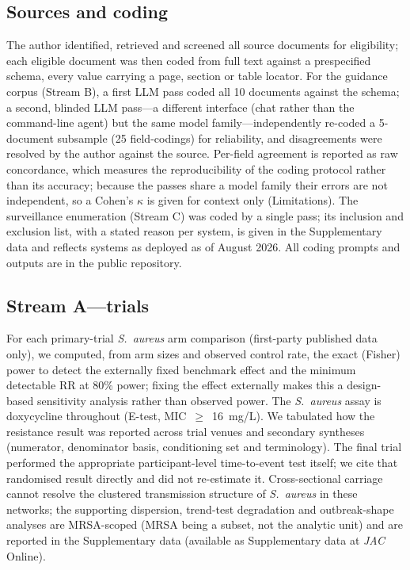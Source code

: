 \documentclass[12pt,a4paper]{article}
\newcommand{\sa}{\emph{S.~aureus}}
\begin{document}
\subsection*{Sources and coding}
The author identified, retrieved and screened all source documents for
eligibility; each eligible document was then coded from full text against a
prespecified schema, every value carrying a page, section or table locator. For
the guidance corpus (Stream B), a first LLM pass coded all 10 documents against
the schema; a second, blinded LLM pass---a different interface (chat rather than
the command-line agent) but the same model family---independently re-coded a
5-document subsample (25 field-codings) for reliability, and disagreements were
resolved by the author against the source. Per-field agreement is reported as raw
concordance, which measures the reproducibility of the coding protocol rather than
its accuracy; because the passes share a model family their errors are not
independent, so a Cohen's $\kappa$ is given for context only (Limitations). The surveillance enumeration (Stream C) was
coded by a single pass; its inclusion and exclusion list, with a stated reason
per system, is given in the Supplementary data and reflects systems as deployed
as of August 2026. All coding prompts and outputs are in the public repository.

\subsection*{Stream A---trials}
For each primary-trial \sa{} arm comparison (first-party published data only), we
computed, from arm sizes and observed control rate, the exact (Fisher) power to
detect the externally fixed benchmark effect and the minimum detectable RR at
80\% power; fixing the effect externally makes this a design-based sensitivity
analysis rather than observed power. The \sa{} assay is doxycycline throughout
(E-test, MIC~$\geq$~16~mg/L). We tabulated how the resistance result was reported
across trial venues and secondary syntheses (numerator, denominator basis,
conditioning set and terminology). The final trial performed the appropriate
participant-level time-to-event test itself; we cite that randomised result
directly and did not re-estimate it. Cross-sectional carriage cannot resolve the
clustered transmission structure of \sa{} in these networks; the supporting
dispersion, trend-test degradation and outbreak-shape analyses are MRSA-scoped
(MRSA being a subset, not the analytic unit) and are reported in the
Supplementary data (available as Supplementary data at \textit{JAC} Online).
\end{document}
